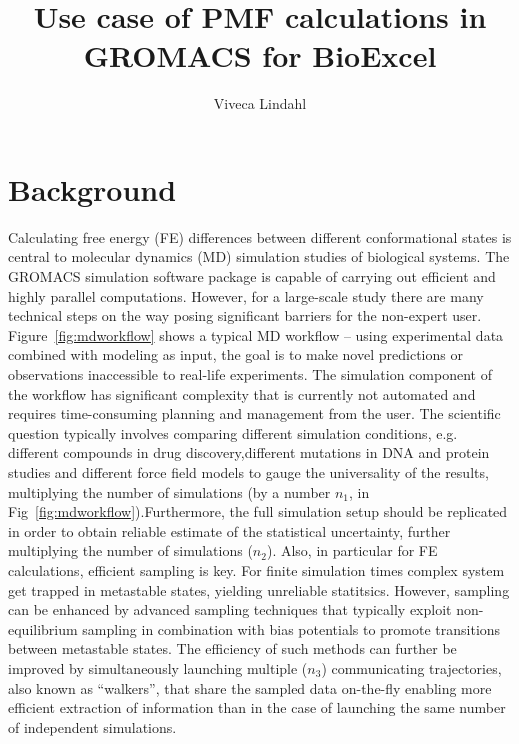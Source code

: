 \documentclass[11pt,a4paper]{article}
\title{Use case of PMF calculations in GROMACS for BioExcel}
\author{Viveca Lindahl}
\begin{document}
\maketitle
\tableofcontents

\section{Background}
Calculating free energy (FE) differences between different conformational states is central to molecular dynamics (MD) simulation studies of biological systems. The GROMACS simulation software package is capable of carrying out efficient and highly parallel computations. However, for a large-scale study there are many technical steps on the way posing significant barriers for the non-expert user. Figure~\ref{fig:mdworkflow} shows a typical MD workflow -- using experimental data combined with modeling as input, the goal is to  make novel predictions or observations inaccessible to real-life experiments. The simulation component of the workflow has significant complexity that is currently not automated and requires time-consuming planning and management from the user. The scientific question typically involves comparing different simulation conditions, e.g. different compounds in drug discovery,different mutations in DNA and protein studies and different force field models to gauge the universality of the results,  multiplying the number of simulations (by a number $n_1$, in Fig~\ref{fig:mdworkflow}).Furthermore, the full simulation setup should be replicated in order to obtain reliable estimate of the statistical uncertainty, further multiplying the number of simulations ($n_2$).  Also, in particular for FE calculations, efficient sampling is key. For finite simulation times complex system get trapped in metastable states, yielding unreliable statitsics. However, sampling can be enhanced by advanced sampling techniques that typically exploit non-equilibrium sampling in combination with bias potentials to promote transitions between metastable states. The efficiency of such methods can further be improved by simultaneously launching multiple ($n_3$) communicating trajectories, also known as ``walkers'', that share the sampled data on-the-fly enabling more efficient extraction of information than in the case of launching the same number of independent simulations.     
\end{document}
